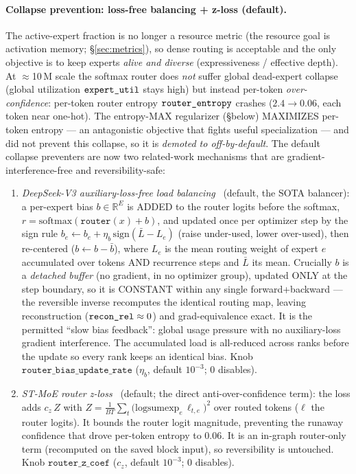 \documentclass[11pt]{article}
\newcommand{\code}[1]{\texttt{#1}}
\begin{document}
\paragraph{Collapse prevention: loss-free balancing + z-loss (default).}
The active-expert fraction is no longer a resource metric (the resource goal is
activation memory; \S\ref{sec:metrics}), so dense routing is acceptable and the only objective is to
keep experts \emph{alive and diverse} (expressiveness / effective depth).  At \(\approx\)10\,M scale
the softmax router does \emph{not} suffer global dead-expert collapse (global utilization
\(\code{\detokenize{expert_util}}\) stays high) but instead per-token \emph{over-confidence}:
per-token router entropy \(\code{\detokenize{router_entropy}}\) crashes (\(2.4\to0.06\), each token
near one-hot).  The entropy-MAX regularizer (\S below) MAXIMIZES per-token entropy --- an antagonistic
objective that fights useful specialization --- and did not prevent this collapse, so it is
\emph{demoted to off-by-default}.  The default collapse preventers are now two related-work mechanisms
that are gradient-interference-free and reversibility-safe:
\begin{enumerate}
\item \emph{DeepSeek-V3 auxiliary-loss-free load balancing}~\cite{deepseekv3} (default, the SOTA
  balancer):  a per-expert bias \(b\in\mathbb{R}^E\) is ADDED to the router logits before the softmax,
  \(r=\mathrm{softmax}(\code{router}(x)+b)\), and updated once per optimizer step by the sign rule
  \(b_e\!\leftarrow\!b_e + \eta_b\,\mathrm{sign}(\bar L - L_e)\) (raise under-used, lower over-used),
  then re-centered (\(b\!\leftarrow\!b-\bar b\)), where \(L_e\) is the mean routing weight of expert
  \(e\) accumulated over tokens AND recurrence steps and \(\bar L\) its mean.  Crucially \(b\) is a
  \emph{detached buffer} (no gradient, in no optimizer group), updated ONLY at the step boundary, so it
  is CONSTANT within any single forward+backward --- the reversible inverse recomputes the identical
  routing map, leaving reconstruction (\(\code{\detokenize{recon_rel}}\approx0\)) and grad-equivalence
  exact.  It is the permitted ``slow bias feedback'': global usage pressure with no auxiliary-loss
  gradient interference.  The accumulated load is all-reduced across ranks before the update so every
  rank keeps an identical bias.  Knob \(\texttt{router\_bias\_update\_rate}\) (\(\eta_b\), default
  \(10^{-3}\); 0 disables).
\item \emph{ST-MoE router z-loss}~\cite{stmoe} (default; the direct anti-over-confidence term):  the
  loss adds \(c_z\,Z\) with \(Z=\frac{1}{BT}\sum_{t}\big(\mathrm{logsumexp}_e\,\ell_{t,e}\big)^2\) over
  routed tokens (\(\ell\) the router logits).  It bounds the router logit magnitude, preventing the
  runaway confidence that drove per-token entropy to \(0.06\).  It is an in-graph router-only term
  (recomputed on the saved block input), so reversibility is untouched.  Knob
  \(\texttt{router\_z\_coef}\) (\(c_z\), default \(10^{-3}\); 0 disables).
\end{enumerate}
\end{document}
